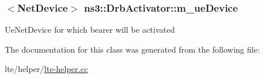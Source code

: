 \subsubsection[{\texorpdfstring{m\+\_\+ue\+Device}{m_ueDevice}}]{$<${\bf Net\+Device}$>$ ns3\+::\+Drb\+Activator\+::m\+\_\+ue\+Device\hspace{0.3cm}{\ttfamily [private]}}\hypertarget{classns3_1_1DrbActivator_aaf698604ccc229d99c944a390222e9b4}{}\label{classns3_1_1DrbActivator_aaf698604ccc229d99c944a390222e9b4}
Ue\+Net\+Device for which bearer will be activated 

The documentation for this class was generated from the following file\+:\begin{DoxyCompactItemize}
\item 
lte/helper/\hyperlink{lte-helper_8cc}{lte-\/helper.\+cc}\end{DoxyCompactItemize}
